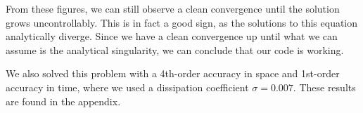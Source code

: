 From these figures, we can still observe a clean convergence until the solution grows uncontrollably. This is in fact a good sign, as the solutions to this equation analytically diverge. Since we have a clean convergence up until what we can assume is the analytical singularity, we can conclude that our code is working.

We also solved this problem with a 4th-order accuracy in space and 1st-order accuracy in time, where we used a dissipation coefficient $\sigma = 0.007$. These results are found in the appendix.